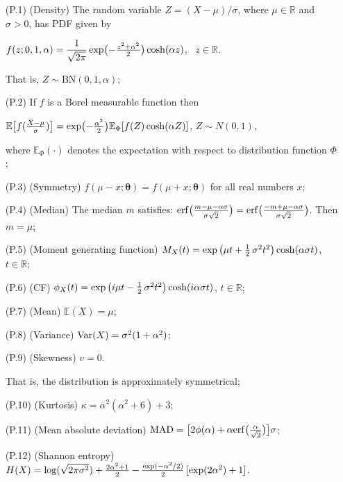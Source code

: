 \documentclass[12pt]{article}
\theoremstyle{definition}
\begin{document}
\begin{enumerate}
\item[(P.1)] (Density) The random variable $Z=(X-\mu)/\sigma$, where $\mu\in\mathbb{R}$ and $\sigma>0$, has PDF given by

$f(z;0,1,\alpha)
=
\dfrac{1}{\sqrt{2\pi}}
\exp\bigl(-{z^2 + \alpha^2\over 2}\bigr)
\cosh(\alpha z)$,
\ $z\in\mathbb{R}$.

That is, $Z\sim \text{BN}(0,1,\alpha)$;
\item[(P.2)] If $f$ is a Borel measurable function then

$\mathbb{E}\big[f({X-\mu\over\sigma})\big]=\exp\bigl(-{\alpha^2\over 2}\bigr)\mathbb{E}_{\Phi}[f(Z)\cosh(\alpha Z)]$, $Z\sim N(0,1)$,

where $\mathbb{E}_{\Phi}(\cdot)$ denotes the expectation with respect to distribution function $\Phi$;
\item[(P.3)] (Symmetry) $f(\mu-x;\boldsymbol{\theta})=f(\mu+x;\boldsymbol{\theta})$ for all real numbers $x$;
\item[(P.4)] (Median) The median $m$ satisfies:
${\rm erf}\big({m-\mu-\alpha\sigma\over\sigma\sqrt{2}}\big)={\rm erf}\big({-m+\mu-\alpha\sigma\over \sigma\sqrt{2}}\big)$. Then $m=\mu$;
\item[(P.5)] (Moment generating function) 
$M_X(t)=  
\exp\big(\mu t+{1\over 2}\, \sigma^2 t^2\big) \cosh(\alpha\sigma t)$, $t\in\mathbb{R}$;
\item[(P.6)] (CF) $\phi_X(t)= \exp\big(i\mu t-{1\over 2}\, \sigma^2 t^2\big) \cosh(i\alpha\sigma t)$, $t\in\mathbb{R}$;
\item[(P.7)] (Mean) $\mathbb{E}(X)=\mu$; %
\item[(P.8)] (Variance) ${\rm Var}(X)=\sigma^2(1+\alpha^2)$;
\item[(P.9)] (Skewness) $v=0$. 

That is, the distribution is approximately symmetrical;
\item[(P.10)] (Kurtosis) $\kappa=\alpha^2(\alpha^2+6)+3$;
\item[(P.11)] (Mean absolute deviation) 
${\rm MAD}=
\big[2\phi(\alpha)+\alpha{\rm erf}\big({\alpha\over \sqrt{2}}\big)\big]\sigma$;
\item[(P.12)] (Shannon entropy) $H(X)=\log(\sqrt{2\pi\sigma^2})+{2\alpha^2+1\over 2}-{\exp(-\alpha^2/2)\over 2}\,[\exp(2\alpha^2)+1]$.
\end{enumerate}
\end{document}
